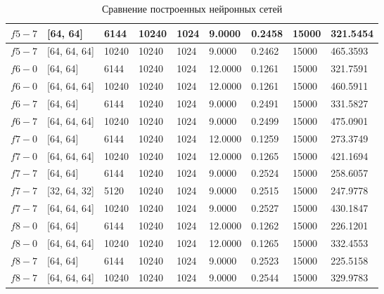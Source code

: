\begin{table}[H]
\begin{tabular}{|l|l|l|l|l|l|l|l|l|}
$ f5-7 $  & [64, 64] & 6144 & 10240 & 1024 & 9.0000 & 0.2458 & 15000 & 321.5454 \\ \hline
$ f5-7 $  & [64, 64, 64] & 10240 & 10240 & 1024 & 9.0000 & 0.2462 & 15000 & 465.3593 \\ \hline
$ f6-0 $  & [64, 64] & 6144 & 10240 & 1024 & 12.0000 & 0.1261 & 15000 & 321.7591 \\ \hline
$ f6-0 $  & [64, 64, 64] & 10240 & 10240 & 1024 & 12.0000 & 0.1261 & 15000 & 460.5911 \\ \hline
$ f6-7 $  & [64, 64] & 6144 & 10240 & 1024 & 9.0000 & 0.2491 & 15000 & 331.5827 \\ \hline
$ f6-7 $  & [64, 64, 64] & 10240 & 10240 & 1024 & 9.0000 & 0.2499 & 15000 & 475.0901 \\ \hline
$ f7-0 $  & [64, 64] & 6144 & 10240 & 1024 & 12.0000 & 0.1259 & 15000 & 273.3749 \\ \hline
$ f7-0 $  & [64, 64, 64] & 10240 & 10240 & 1024 & 12.0000 & 0.1265 & 15000 & 421.1694 \\ \hline
$ f7-7 $  & [64, 64] & 6144 & 10240 & 1024 & 9.0000 & 0.2524 & 15000 & 258.6057 \\ \hline
$ f7-7 $  & [32, 64, 32] & 5120 & 10240 & 1024 & 9.0000 & 0.2515 & 15000 & 247.9778 \\ \hline
$ f7-7 $  & [64, 64, 64] & 10240 & 10240 & 1024 & 9.0000 & 0.2527 & 15000 & 430.1847 \\ \hline
$ f8-0 $  & [64, 64] & 6144 & 10240 & 1024 & 12.0000 & 0.1262 & 15000 & 226.1201 \\ \hline
$ f8-0 $  & [64, 64, 64] & 10240 & 10240 & 1024 & 12.0000 & 0.1265 & 15000 & 332.4553 \\ \hline
$ f8-7 $  & [64, 64] & 6144 & 10240 & 1024 & 9.0000 & 0.2523 & 15000 & 225.5158 \\ \hline
$ f8-7 $  & [64, 64, 64] & 10240 & 10240 & 1024 & 9.0000 & 0.2544 & 15000 & 329.9783 \\ \hline
		\hline
	\end{tabular}
	\caption{Сравнение построенных нейронных сетей}
	\label{diff_f}
\end{table}
\bigskip

